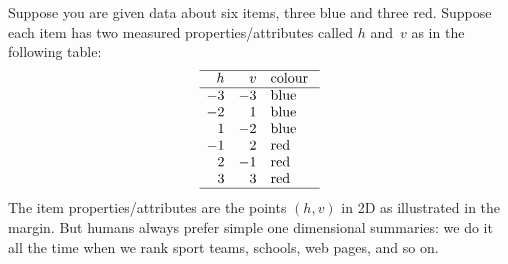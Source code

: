 \begin{example} \label{eg:toypca}
Suppose you are given data about six items, three blue and three red.
Suppose each item has two measured properties\slash attributes called \(h\) and~\(v\) as in the following table:
\begin{equation*}
\begin{array}{rrp{3em}}
\hline h&v&colour\\\hline
-3&-3&blue \\
-2&1&blue \\
1&-2&blue \\
-1&2&red \\
2&-1&red \\
3&3&red \\\hline
\end{array}
\end{equation*}
%
The item properties\slash attributes are the points \((h,v)\) in 2D as illustrated in the margin.
But humans always prefer simple one dimensional summaries: we do it all the time when we rank sport teams, schools, web pages, and so on.


\end{example}
